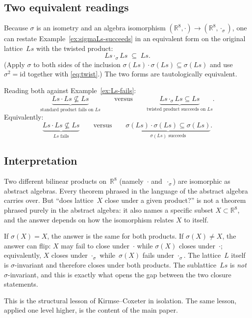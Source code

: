 \documentclass[11pt]{amsart}
\newcommand{\RR}{\mathbb{R}}
\begin{document}
\subsection*{Two equivalent readings}

Because $\sigma$ is an isometry and an algebra isomorphism
$(\RR^8, \cdot) \to (\RR^8, \cdot_\sigma)$, one can restate
Example~\ref{ex:sigmaLs-succeeds} in an equivalent form on the
original lattice~$Ls$ with the twisted product:
\[
  Ls \cdot_\sigma Ls \;\subseteq\; Ls.
\]
(Apply $\sigma$ to both sides of the inclusion
$\sigma(Ls) \cdot \sigma(Ls) \subseteq \sigma(Ls)$ and use
$\sigma^2 = \mathrm{id}$ together with
\eqref{eq:twist}.)  The two forms are tautologically equivalent.

Reading both against Example~\ref{ex:Ls-fails}:
\[
  \underbrace{Ls \cdot Ls \not\subseteq Ls}_{\text{standard product
  fails on $Ls$}}
  \qquad\text{versus}\qquad
  \underbrace{Ls \cdot_\sigma Ls \subseteq Ls}_{\text{twisted product
  succeeds on $Ls$}}.
\]
Equivalently:
\[
  \underbrace{Ls \cdot Ls \not\subseteq Ls}_{\text{$Ls$ fails}}
  \qquad\text{versus}\qquad
  \underbrace{\sigma(Ls) \cdot \sigma(Ls) \subseteq \sigma(Ls)}
    _{\text{$\sigma(Ls)$ succeeds}}.
\]

\subsection*{Interpretation}

Two different bilinear products on~$\RR^8$ (namely~$\cdot$
and~$\cdot_\sigma$) are isomorphic as abstract algebras.  Every
theorem phrased in the language of the abstract algebra carries
over.  But ``does lattice~$X$ close under a given product?'' is not
a theorem phrased purely in the abstract algebra: it also names a
specific subset $X \subset \RR^8$, and the answer depends on how the
isomorphism relates $X$ to itself.

If $\sigma(X) = X$, the answer is the same for both products.  If
$\sigma(X) \ne X$, the answer can flip: $X$ may fail to close
under~$\cdot$ while $\sigma(X)$ closes under~$\cdot$; equivalently,
$X$ closes under $\cdot_\sigma$ while~$\sigma(X)$ fails under
$\cdot_\sigma$.  The lattice~$L$ itself is $\sigma$-invariant and
therefore closes under both products.  The sublattice~$Ls$ is
\emph{not} $\sigma$-invariant, and this is exactly what opens the
gap between the two closure statements.

This is the structural lesson of Kirmse--Coxeter in isolation.  The
same lesson, applied one level higher, is the content of the
main paper.
\end{document}
